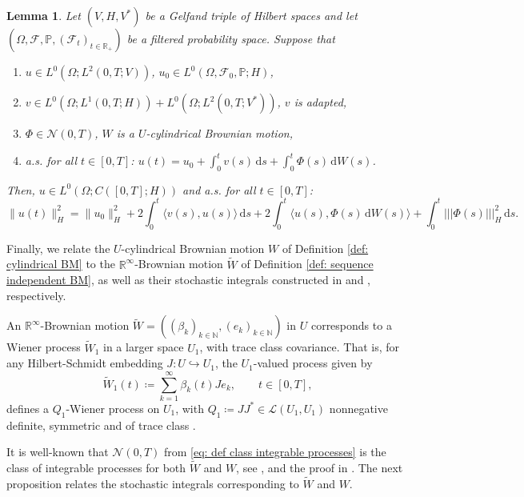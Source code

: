 \documentclass{amsart}
\newcommand{\dd}{\,\mathrm{d}}
\newcommand{\<}{\langle}
\newcommand{\?}{\rangle}
\newcommand{\nn}{|\!|\!|}
\newcommand{\into}{\hookrightarrow}
\theoremstyle{plain}
\theoremstyle{remark}
\theoremstyle{plain}
\newtheorem{lemma}[theorem]{Lemma}
\numberwithin{equation}{section}
\def\N{{\mathbb N}}
\def\R{{\mathbb R}}
\newcommand{\F}{\mathcal{F}}
\renewcommand{\P}{\mathbb{P}}
\newcommand{\Om}{\Omega}
\begin{document}
\begin{lemma}{\cite[Th. 3.1 p. 57, Th. 3.3 p. 59]{pardoux}}\label{lem: Ito pardoux}
  Let $(V,H,V^*)$ be a Gelfand triple of Hilbert spaces and let $(\Om,\F,\P,(\F_t)_{t\in\R_+})$ be a filtered probability space. Suppose that
  \begin{enumerate}[label=\emph{(\roman*)},ref=\textup{(\roman*)}]
    \item $u\in L^0(\Om;L^2(0,T;V))$, $u_0\in L^0(\Om,\F_0,\P;H)$,
    \item $v\in L^0(\Om;L^1(0,T;H))+L^0(\Om;L^{2}(0,T;V^*))$, $v$ is adapted,
    \item $\Phi\in\mathcal{N}(0,T)$, $W$ is a $U$-cylindrical Brownian motion,
    \item a.s. for all $t\in[0,T]$: $u(t)=u_0+\int_0^t v(s)\dd s+\int_0^t \Phi(s)\dd W(s)$.
  \end{enumerate}
  Then, $u\in L^0(\Om;C([0,T];H))$ and a.s. \!for all  $t\in[0,T]$:
  \begin{equation}\label{eq: Ito pardoux}
  \|u(t)\|_H^2 =\|u_0\|_H^2+2\int_0^t\<v(s),u(s)\?\dd s+2\int_0^t\<u(s),\Phi(s) \dd W(s)\?+\int_0^t \nn \Phi(s)\nn_H^2 \dd s.
  \end{equation}
\end{lemma}


Finally, we relate the $U$-cylindrical Brownian motion $W$ of Definition \ref{def: cylindrical BM} to the $\R^\infty$-Brownian motion $\tilde{W}$ of Definition \ref{def: sequence independent BM}, as well as their stochastic integrals constructed in \cite{NVW15} and \cite{liurockner15}, respectively.

An $\R^\infty$-Brownian motion $\tilde{W}=((\beta_k)_{k\in\N},(e_k)_{k\in\N})$ in $U$ corresponds to a Wiener process $\tilde{W}_1$ in a larger space $U_1$, with trace class covariance. That is, for any Hilbert-Schmidt embedding $J\colon U\into U_1$, the $U_1$-valued process given by
\begin{equation}\label{eq: Q-Wiener appendix}
\tilde{W}_1(t)\coloneqq \sum_{k=1}^{\infty}\beta_k(t)J e_k, \qquad t\in[0,T],
\end{equation}
defines a $Q_1$-Wiener process on $U_1$, with $Q_1\coloneqq JJ^*\in\mathcal{L}(U_1,U_1)$ nonnegative definite, symmetric and of trace class \cite[Prop. 2.5.2]{liurockner15}.

It is well-known that $\mathcal{N}(0,T)$ from  \eqref{eq: def class integrable processes} is the class of integrable processes for both $\tilde{W}$ and $W$,   see \cite[p. 52, p. 53]{liurockner15}, \cite[Prop. 2.13]{AV22nonlinear1} and the  proof in \cite[p. 306, \S 5.4 $(p=0)$]{NVW15}.
The next proposition relates the stochastic integrals corresponding to $\tilde{W}$ and $W$.
\end{document}
